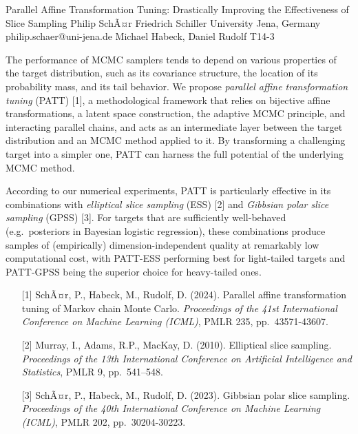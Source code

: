 \begin{talk}
\end{talk}

\begin{talk}
  {Parallel Affine Transformation Tuning: Drastically Improving the Effectiveness of Slice Sampling}%
  {Philip SchÃ¤r}%
  {Friedrich Schiller University Jena, Germany}%
  {philip.schaer@uni-jena.de}%
  {Michael Habeck, Daniel Rudolf}%
  {T14-3}%

The performance of MCMC samplers tends to depend on various properties of the target distribution, such as its covariance structure, the location of its probability mass, and its tail behavior. We propose \textit{parallel affine transformation tuning} (PATT) [1], a methodological framework that relies on bijective affine transformations, a latent space construction, the adaptive MCMC principle, and interacting parallel chains, and acts as an intermediate layer between the target distribution and an MCMC method applied to it. By transforming a challenging target into a simpler one, PATT can harness the full potential of the underlying MCMC method.

According to our numerical experiments, PATT is particularly effective in its combinations with \textit{elliptical slice sampling} (ESS) [2] and \textit{Gibbsian polar slice sampling} (GPSS) [3]. For targets that are sufficiently well-behaved (e.g.~posteriors in Bayesian logistic regression), these combinations produce samples of (empirically) dimension-independent quality at remarkably low computational cost, with PATT-ESS performing best for light-tailed targets and PATT-GPSS being the superior choice for heavy-tailed ones.

\medskip

\begin{enumerate}
	\item[{[1]}] SchÃ¤r, P., Habeck, M., Rudolf, D. (2024). Parallel affine transformation tuning of Markov chain Monte Carlo. \textit{Proceedings of the 41st International Conference on Machine Learning (ICML)}, PMLR 235, pp.~43571-43607.
	\item[{[2]}] Murray, I., Adams, R.P., MacKay, D. (2010). Elliptical slice sampling. \textit{Proceedings of the 13th International Conference on Artificial Intelligence and Statistics}, PMLR 9, pp.~541--548.
	\item[{[3]}] SchÃ¤r, P., Habeck, M., Rudolf, D. (2023). Gibbsian polar slice sampling. \textit{Proceedings of the 40th International Conference on Machine Learning (ICML)}, PMLR 202, pp.~30204-30223.
\end{enumerate}

\end{talk}


